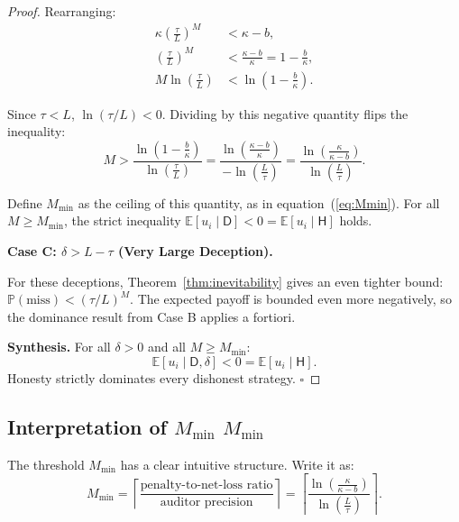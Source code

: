 \documentclass[11pt,a4paper]{article}
\theoremstyle{definition}
\theoremstyle{remark}
\newcommand{\E}{\mathbb{E}}
\newcommand{\Pbb}{\mathbb{P}}
\newcommand{\honest}{\mathsf{H}}
\newcommand{\dishonest}{\mathsf{D}}
\newcommand{\deception}{\delta}
\newcommand{\threshold}{\tau}
\newcommand{\tol}{L}
\newcommand{\cost}{\kappa}
\begin{document}
\begin{proof}
Rearranging:
\begin{align}
    \cost \left(\frac{\threshold}{\tol}\right)^M &< \cost - b, \\
    \left(\frac{\threshold}{\tol}\right)^M &< \frac{\cost - b}{\cost} = 1 - \frac{b}{\cost}, \\
    M \ln\left(\frac{\threshold}{\tol}\right) &< \ln\left(1 - \frac{b}{\cost}\right).
\end{align}

Since $\threshold < \tol$, $\ln(\threshold/\tol) < 0$. Dividing by this negative quantity flips the inequality:
\begin{equation}
    M > \frac{\ln\left(1 - \frac{b}{\cost}\right)}{\ln\left(\frac{\threshold}{\tol}\right)}
      = \frac{\ln\left(\frac{\cost - b}{\cost}\right)}{-\ln\left(\frac{\tol}{\threshold}\right)}
      = \frac{\ln\left(\frac{\cost}{\cost - b}\right)}{\ln\left(\frac{\tol}{\threshold}\right)}.
    \label{eq:M_bound}
\end{equation}

Define $M_{\min}$ as the ceiling of this quantity, as in equation~(\ref{eq:Mmin}). For all $M \geq M_{\min}$, the strict inequality $\E[u_i \mid \dishonest] < 0 = \E[u_i \mid \honest]$ holds.

\medskip
\noindent\textbf{Case C: $\deception > \tol - \threshold$ (Very Large Deception).}

For these deceptions, Theorem~\ref{thm:inevitability} gives an even tighter bound: $\Pbb(\text{miss}) < (\threshold/\tol)^M$. The expected payoff is bounded even more negatively, so the dominance result from Case B applies a fortiori.

\medskip
\noindent\textbf{Synthesis.} For all $\deception > 0$ and all $M \geq M_{\min}$:
\begin{equation}
    \E[u_i \mid \dishonest, \deception] < 0 = \E[u_i \mid \honest].
\end{equation}
Honesty strictly dominates every dishonest strategy. $\square$
\end{proof}

\subsection{Interpretation of $M_{\min}$ $M_{\min}$}

The threshold $M_{\min}$ has a clear intuitive structure. Write it as:
\begin{equation}
    M_{\min} = \left\lceil \frac{\text{penalty-to-net-loss ratio}}{\text{auditor precision}} \right\rceil
    = \left\lceil \frac{\ln\left(\frac{\cost}{\cost - b}\right)}{\ln\left(\frac{\tol}{\threshold}\right)} \right\rceil.
\end{equation}
\end{document}
